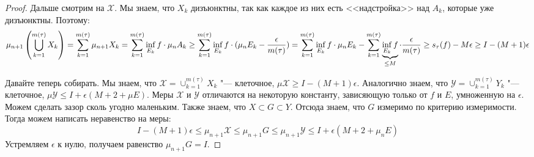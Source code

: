 \begin{proof}
	Дальше смотрим на $\mathcal{X}$.
	Мы знаем, что $X_k$ дизъюнктны, так как каждое из них есть <<надстройка>> над $A_k$, которые уже дизъюнктны.
	Поэтому:
	\begin{gather*}
	\mu_{n+1} \left( \bigcup_{k=1}^{m(\tau)} X_k \right)
	= \sum_{k=1}^{m(\tau)} \mu_{n+1} X_k
	= \sum_{k=1}^{m(\tau)} \inf_{E_k} f \cdot \mu_n A_k
	\ge \sum_{k=1}^{m(\tau)} \inf_{E_k} f \cdot (\mu_n E_k - \frac{\epsilon}{m(\tau)})
	= \sum_{k=1}^{m(\tau)} \inf_{E_k} f \cdot \mu_n E_k - \sum_{k=1}^{m(\tau)} \underbrace{\inf_{E_k} f}_{\le M} \cdot \frac{\epsilon}{m(\tau)}
	\ge s_\tau(f) - M \epsilon
	\ge I - (M+1)\epsilon
	\end{gather*}

	Давайте теперь собирать.
	Мы знаем, что $\mathcal{X} = \cup_{k=1}^{m(\tau)} X_k$ "--- клеточное, $\mu \mathcal{X} \ge I - (M+1)\epsilon$.
	Аналогично знаем, что $\mathcal{Y} = \cup_{k=1}^{m(\tau)} Y_k$ "--- клеточное, $\mu \mathcal{Y} \le I + \epsilon(M+2+\mu E)$.
	Меры $\mathcal{X}$ и $\mathcal{Y}$ отличаются на некоторую константу, зависяющую только от $f$ и $E$, умноженную на $\epsilon$.
	Можем сделать зазор сколь угодно маленьким.
	Также знаем, что $X \subset G \subset Y$.
	Отсюда знаем, что $G$ измеримо по критерию измеримости.
	Тогда можем написать неравенство на меры:
	\[
	I - (M+1)\epsilon \le \mu_{n+1}\mathcal{X} \le \mu_{n+1} G \le \mu_{n+1}\mathcal{Y} \le I + \epsilon(M+2+\mu_n E)
	\]
	Устремляем $\epsilon$ к нулю, получаем равенство $\mu_{n+1} G = I$.
\end{proof}

